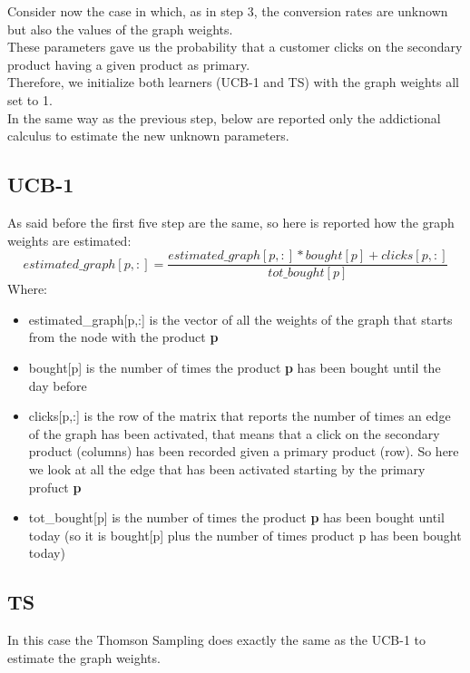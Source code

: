 Consider now the case in which, as in step 3, the conversion rates are unknown but also the values of the graph weights.\\ These parameters gave us the probability that a customer clicks on the secondary product having a given product as primary.\\ Therefore, we initialize both learners (UCB-1 and TS) with the graph weights all set to 1.\\ 
In the same way as the previous step, below are reported only the addictional calculus to estimate the new unknown parameters.

\subsection{UCB-1}
As said before the first five step are the same, so here is reported how the graph weights are estimated:
\begin{equation}
    estimated\_graph[p,:] = \frac{estimated\_graph[p,:] * bought[p] + clicks[p,:]}{tot\_bought[p]}
\end{equation}Where: \begin{itemize}
    \item estimated\_graph[p,:] is the vector of all the weights of the graph that starts from the node with the product {\bf p}
    \item bought[p] is the number of times the product {\bf p} has been bought until the day before
    \item clicks[p,:] is the row of the matrix that reports the number of times an edge of the graph has been activated, that means that a click on the secondary product (columns) has been recorded given a primary product (row). So here we look at all the edge that has been activated starting by the primary profuct {\bf p}
    \item tot\_bought[p] is the number of times the product {\bf p} has been bought until today (so it is bought[p] plus the number of times product p has been bought today)
\end{itemize}
\subsection{TS}
In this case the Thomson Sampling does exactly the same as the UCB-1 to estimate the graph weights.
